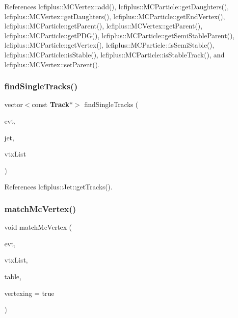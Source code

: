 References lcfiplus\+::\+M\+C\+Vertex\+::add(), lcfiplus\+::\+M\+C\+Particle\+::get\+Daughters(), lcfiplus\+::\+M\+C\+Vertex\+::get\+Daughters(), lcfiplus\+::\+M\+C\+Particle\+::get\+End\+Vertex(), lcfiplus\+::\+M\+C\+Particle\+::get\+Parent(), lcfiplus\+::\+M\+C\+Vertex\+::get\+Parent(), lcfiplus\+::\+M\+C\+Particle\+::get\+P\+D\+G(), lcfiplus\+::\+M\+C\+Particle\+::get\+Semi\+Stable\+Parent(), lcfiplus\+::\+M\+C\+Particle\+::get\+Vertex(), lcfiplus\+::\+M\+C\+Particle\+::is\+Semi\+Stable(), lcfiplus\+::\+M\+C\+Particle\+::is\+Stable(), lcfiplus\+::\+M\+C\+Particle\+::is\+Stable\+Track(), and lcfiplus\+::\+M\+C\+Vertex\+::set\+Parent().

\mbox{\label{Driver_8h_a5da686d98fbf637efb93f6c631041782}} 
\subsubsection{find\+Single\+Tracks()}
{\footnotesize\ttfamily vector$<$const \textbf{ Track}$\ast$$>$ find\+Single\+Tracks (\begin{DoxyParamCaption}\item[{const \textbf{ Event} \&}]{evt,  }\item[{const \textbf{ Jet} \&}]{jet,  }\item[{const vector$<$ \textbf{ lcfiplus\+::\+Vertex} $\ast$$>$ \&}]{vtx\+List }\end{DoxyParamCaption})}



References lcfiplus\+::\+Jet\+::get\+Tracks().

\mbox{\label{Driver_8h_a5f3f75ceb61714f63b458bf1d53cc906}} 
\subsubsection{match\+Mc\+Vertex()}
{\footnotesize\ttfamily void match\+Mc\+Vertex (\begin{DoxyParamCaption}\item[{const \textbf{ Event} \&}]{evt,  }\item[{vector$<$ \textbf{ M\+C\+Vertex} $\ast$$>$ \&}]{vtx\+List,  }\item[{map$<$ \textbf{ M\+C\+Vertex} $\ast$, int $>$ \&}]{table,  }\item[{bool}]{vertexing = {\ttfamily true} }\end{DoxyParamCaption})}



